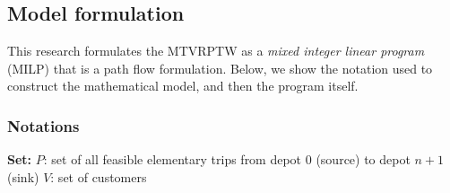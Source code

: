 

\subsection{Model formulation}
\label{sec:model}
This research formulates the MTVRPTW as a \textit{mixed integer linear program} (MILP) that is a path flow formulation.  Below, we show the notation used to construct the mathematical model, and then the program itself.

\subsubsection{Notations}
\textbf{Set:}
\newline
$P$: set of all feasible elementary trips from depot $0$ (source) to depot $n + 1$ (sink)
\newline
$V$: set of customers
\newline

